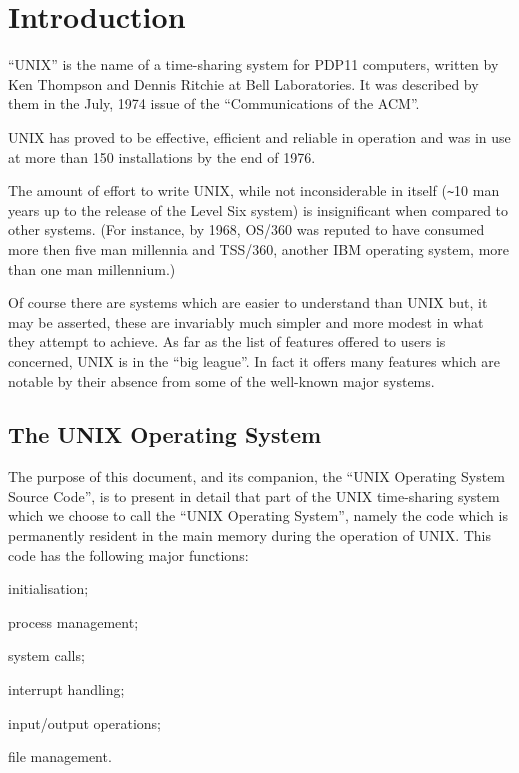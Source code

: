 %
%
\setcounter{page}{1}
\section{Introduction}

``UNIX'' is the name of a time-sharing
system for PDP11 computers, written by
Ken Thompson and Dennis Ritchie at Bell
Laboratories. It was described by them
in the July, 1974 issue of the ``Communications of the ACM''.

UNIX has proved to be effective, efficient
and reliable in operation and was
in use at more than 150 installations
by the end of 1976.

The amount of effort to write UNIX,
while not inconsiderable in itself
(\verb+~+10 man years up to the release of the
Level Six system) is insignificant when
compared to other systems. (For
instance, by 1968, OS/360 was reputed
to have consumed more then five man
millennia and TSS/360, another IBM
operating system, more than one man
millennium.)

Of course there are systems which are
easier to understand than UNIX but, it
may be asserted, these are invariably
much simpler and more modest in what
they attempt to achieve. As far as the
list of features offered to users is
concerned, UNIX is in the ``big league''.
In fact it offers many features which
are notable by their absence from some
of the well-known major systems.

\subsection{The UNIX Operating System}

The purpose of this document, and its
companion, the ``UNIX Operating System
Source Code'', is to present in detail
that part of the UNIX time-sharing system
which we choose to call the ``UNIX
Operating System'', namely the code
which is permanently resident in the
main memory during the operation of
UNIX. This code has the following
major functions:

\bi
\item initialisation;
\item process management;
\item system calls;
\item interrupt handling;
\item input/output operations;
\item file management.
\ei

